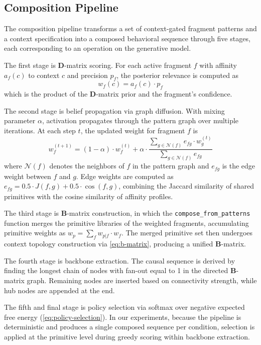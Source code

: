 \documentclass[11pt,a4paper]{article}
\newcommand{\B}{\mathbf{B}}
\newcommand{\D}{\mathbf{D}}
\begin{document}
\subsection{Composition Pipeline}

The composition pipeline transforms a set of context-gated fragment patterns and a context specification into a composed behavioral sequence through five stages, each corresponding to an operation on the generative model.

The first stage is $\D$-matrix scoring.  For each active fragment $f$ with affinity $a_f(c)$ to context $c$ and precision $p_f$, the posterior relevance is computed as
\begin{equation}
  w_f(c) = a_f(c) \cdot p_f
  \label{eq:d-scoring}
\end{equation}
which is the product of the $\D$-matrix prior and the fragment's confidence.

The second stage is belief propagation via graph diffusion.  With mixing parameter $\alpha$, activation propagates through the pattern graph over multiple iterations.  At each step $t$, the updated weight for fragment $f$ is
\begin{equation}
  w_f^{(t+1)} = (1 - \alpha) \cdot w_f^{(t)} + \alpha \cdot \frac{\displaystyle\sum_{g \in \mathcal{N}(f)} e_{fg} \cdot w_g^{(t)}}{\displaystyle\sum_{g \in \mathcal{N}(f)} e_{fg}}
  \label{eq:diffusion}
\end{equation}
where $\mathcal{N}(f)$ denotes the neighbors of $f$ in the pattern graph and $e_{fg}$ is the edge weight between $f$ and $g$.  Edge weights are computed as $e_{fg} = 0.5 \cdot J(f, g) + 0.5 \cdot \cos(f, g)$, combining the Jaccard similarity of shared primitives with the cosine similarity of affinity profiles.

The third stage is $\B$-matrix construction, in which the \texttt{compose\_from\_patterns} function merges the primitive libraries of the weighted fragments, accumulating primitive weights as $w_p = \sum_{f} w_{p|f} \cdot w_f$.  The merged primitive set then undergoes context topology construction via \cref{eq:b-matrix}, producing a unified $\B$-matrix.

The fourth stage is backbone extraction.  The causal sequence is derived by finding the longest chain of nodes with fan-out equal to 1 in the directed $\B$-matrix graph.  Remaining nodes are inserted based on connectivity strength, while hub nodes are appended at the end.

The fifth and final stage is policy selection via softmax over negative expected free energy (\cref{eq:policy-selection}).  In our experiments, because the pipeline is deterministic and produces a single composed sequence per condition, selection is applied at the primitive level during greedy scoring within backbone extraction.
\end{document}
